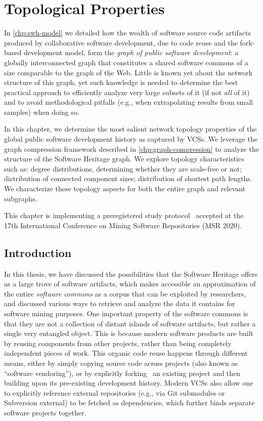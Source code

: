 \chapter{Topological Properties}%
\label{chp:topology}

In \cref{chp:swh-model} we detailed how the wealth of software source
code artifacts produced by collaborative software development, due to code
reuse and the fork-based development model, form the \emph{graph of public
software development}: a globally interconnected graph that constitutes a
shared software commons of a size comparable to the graph of the Web.
Little is known yet about the network structure of this graph, yet such
knowledge is needed to determine the best practical approach to efficiently
analyze very large subsets of it (if not \emph{all} of it) and to avoid
methodological pitfalls (e.g., when extrapolating results from small samples)
when doing so.

In this chapter, we determine the most salient network topology properties of
the global public software development history as captured by \glspl{VCS}. We
leverage the graph compression framework described in
\cref{chp:graph-compression} to analyze the structure of the Software Heritage
graph.
We explore topology characteristics such as: degree distributions,
determining whether they are scale-free or not; distribution of connected
component sizes; distribution of shortest path lengths. We characterize these
topology aspects for both the entire graph and relevant subgraphs.

This chapter is implementing a preregistered study
protocol~\cite{msr-2020-topology} accepted at the 17th International Conference
on Mining Software Repositories (MSR 2020).

\section{Introduction}

In this thesis, we have discussed the possibilities that the Software Heritage
offers as a large trove of software artifacts, which makes accessible an
approximation of the entire \emph{software commons} as a corpus that can be
exploited by researchers, and discussed various ways to retrieve and analyze
the data it contains for software mining purposes.
One important property of the software commons is that they are not a
collection of distant islands of software artifacts, but rather a single very
entangled object. This is because modern software products are built by reusing
components from other projects, rather than being completely independent pieces
of work. This organic code reuse happens through different means, either by
simply copying source code across projects (also known as ``software
vendoring''), or by explicitly forking~\cite{robles2012forks,
swh-msr2020-forking} an existing project and then building upon its
pre-existing development history. Modern \glspl{VCS} also allow one to
explicitly reference external repositories (e.g., via Git submodules or
Subversion external) to be fetched as dependencies, which further binds
separate software projects together.

